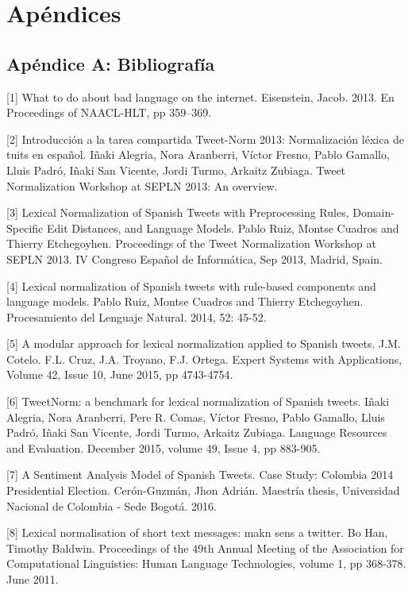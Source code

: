 \documentclass[14pt]{extarticle}
\theoremstyle{definition}
\theoremstyle{remark}
\begin{document}
\section{Apéndices}\label{sec:apendices}
\subsection{Apéndice A: Bibliografía}\label{sec:bibliografia}


[1] What to do about bad language on the internet. Eisenstein, Jacob. 2013. En Proceedings of NAACL-HLT, pp 359–369.

[2] Introducción a la tarea compartida Tweet-Norm 2013: Normalización léxica de tuits en español. Iñaki Alegria, Nora Aranberri, Víctor Fresno, Pablo Gamallo, Lluis Padró, Iñaki San Vicente, Jordi Turmo, Arkaitz Zubiaga. Tweet Normalization Workshop at SEPLN 2013: An overview.

[3] Lexical Normalization of Spanish Tweets with Preprocessing Rules, Domain-Specific Edit Distances, and Language Models. Pablo Ruiz, Montse Cuadros and Thierry Etchegoyhen. Proceedings of the Tweet Normalization Workshop at SEPLN 2013. IV Congreso Español de Informática, Sep 2013, Madrid, Spain.

[4] Lexical normalization of Spanish tweets with rule-based components and language models. Pablo Ruiz, Montse Cuadros and Thierry Etchegoyhen. Procesamiento del Lenguaje Natural. 2014, 52: 45-52.

[5] A modular approach for lexical normalization applied to Spanish tweets. J.M. Cotelo. F.L. Cruz, J.A. Troyano, F.J. Ortega. Expert Systems with Applications, Volume 42, Issue 10, June 2015, pp 4743-4754.

[6] TweetNorm: a benchmark for lexical normalization of Spanish tweets. Iñaki Alegria, Nora Aranberri, Pere R. Comas, Víctor Fresno, Pablo Gamallo, Lluis Padró, Iñaki San Vicente, Jordi Turmo, Arkaitz Zubiaga. Language Resources and Evaluation. December 2015, volume 49, Issue 4, pp 883-905.

[7] A Sentiment Analysis Model of Spanish Tweets. Case Study: Colombia 2014 Presidential Election. Cerón-Guzmán, Jhon Adrián. Maestría thesis, Universidad Nacional de Colombia - Sede Bogotá. 2016.

[8] Lexical normalisation of short text messages: makn sens a twitter. Bo Han, Timothy Baldwin. Proceedings of the 49th Annual Meeting of the Association for Computational Linguistics: Human Language Technologies, volume 1, pp 368-378. June 2011.
\end{document}
